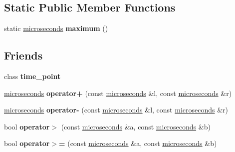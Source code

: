 \subsection*{Static Public Member Functions}
\begin{DoxyCompactItemize}
\item 
\mbox{\label{classfc_1_1microseconds_a83490e326e43e94a2b9f2d23b5645455}} 
static \mbox{\hyperlink{classfc_1_1microseconds}{microseconds}} {\bfseries maximum} ()
\end{DoxyCompactItemize}
\subsection*{Friends}
\begin{DoxyCompactItemize}
\item 
\mbox{\label{classfc_1_1microseconds_aaba1d7b327cc33fcbaf19e870d0c1733}} 
class {\bfseries time\+\_\+point}
\item 
\mbox{\label{classfc_1_1microseconds_a4aefc6bb1acd38167eb501722616714d}} 
\mbox{\hyperlink{classfc_1_1microseconds}{microseconds}} {\bfseries operator+} (const \mbox{\hyperlink{classfc_1_1microseconds}{microseconds}} \&l, const \mbox{\hyperlink{classfc_1_1microseconds}{microseconds}} \&r)
\item 
\mbox{\label{classfc_1_1microseconds_ada590d04fee1d36be15cdda38b581531}} 
\mbox{\hyperlink{classfc_1_1microseconds}{microseconds}} {\bfseries operator-\/} (const \mbox{\hyperlink{classfc_1_1microseconds}{microseconds}} \&l, const \mbox{\hyperlink{classfc_1_1microseconds}{microseconds}} \&r)
\item 
\mbox{\label{classfc_1_1microseconds_afce366cbc2e650931e2d1eb856c1339e}} 
bool {\bfseries operator$>$} (const \mbox{\hyperlink{classfc_1_1microseconds}{microseconds}} \&a, const \mbox{\hyperlink{classfc_1_1microseconds}{microseconds}} \&b)
\item 
\mbox{\label{classfc_1_1microseconds_ad4531296ec947832cc4b3f5dfbc9fc0b}} 
bool {\bfseries operator$>$=} (const \mbox{\hyperlink{classfc_1_1microseconds}{microseconds}} \&a, const \mbox{\hyperlink{classfc_1_1microseconds}{microseconds}} \&b)

\end{DoxyCompactItemize}
